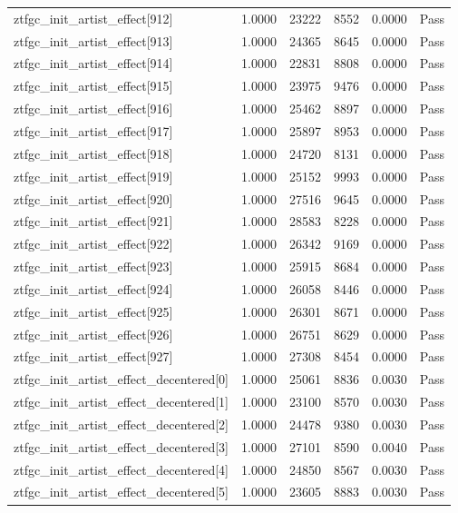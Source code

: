 \begin{table}[htbp]
\begin{tabular}{llrrll}
ztfgc\_init\_artist\_effect[912] & 1.0000 & 23222 & 8552 & 0.0000 & Pass \\
ztfgc\_init\_artist\_effect[913] & 1.0000 & 24365 & 8645 & 0.0000 & Pass \\
ztfgc\_init\_artist\_effect[914] & 1.0000 & 22831 & 8808 & 0.0000 & Pass \\
ztfgc\_init\_artist\_effect[915] & 1.0000 & 23975 & 9476 & 0.0000 & Pass \\
ztfgc\_init\_artist\_effect[916] & 1.0000 & 25462 & 8897 & 0.0000 & Pass \\
ztfgc\_init\_artist\_effect[917] & 1.0000 & 25897 & 8953 & 0.0000 & Pass \\
ztfgc\_init\_artist\_effect[918] & 1.0000 & 24720 & 8131 & 0.0000 & Pass \\
ztfgc\_init\_artist\_effect[919] & 1.0000 & 25152 & 9993 & 0.0000 & Pass \\
ztfgc\_init\_artist\_effect[920] & 1.0000 & 27516 & 9645 & 0.0000 & Pass \\
ztfgc\_init\_artist\_effect[921] & 1.0000 & 28583 & 8228 & 0.0000 & Pass \\
ztfgc\_init\_artist\_effect[922] & 1.0000 & 26342 & 9169 & 0.0000 & Pass \\
ztfgc\_init\_artist\_effect[923] & 1.0000 & 25915 & 8684 & 0.0000 & Pass \\
ztfgc\_init\_artist\_effect[924] & 1.0000 & 26058 & 8446 & 0.0000 & Pass \\
ztfgc\_init\_artist\_effect[925] & 1.0000 & 26301 & 8671 & 0.0000 & Pass \\
ztfgc\_init\_artist\_effect[926] & 1.0000 & 26751 & 8629 & 0.0000 & Pass \\
ztfgc\_init\_artist\_effect[927] & 1.0000 & 27308 & 8454 & 0.0000 & Pass \\
ztfgc\_init\_artist\_effect\_decentered[0] & 1.0000 & 25061 & 8836 & 0.0030 & Pass \\
ztfgc\_init\_artist\_effect\_decentered[1] & 1.0000 & 23100 & 8570 & 0.0030 & Pass \\
ztfgc\_init\_artist\_effect\_decentered[2] & 1.0000 & 24478 & 9380 & 0.0030 & Pass \\
ztfgc\_init\_artist\_effect\_decentered[3] & 1.0000 & 27101 & 8590 & 0.0040 & Pass \\
ztfgc\_init\_artist\_effect\_decentered[4] & 1.0000 & 24850 & 8567 & 0.0030 & Pass \\
ztfgc\_init\_artist\_effect\_decentered[5] & 1.0000 & 23605 & 8883 & 0.0030 & Pass \\

\end{tabular}
\end{table}
